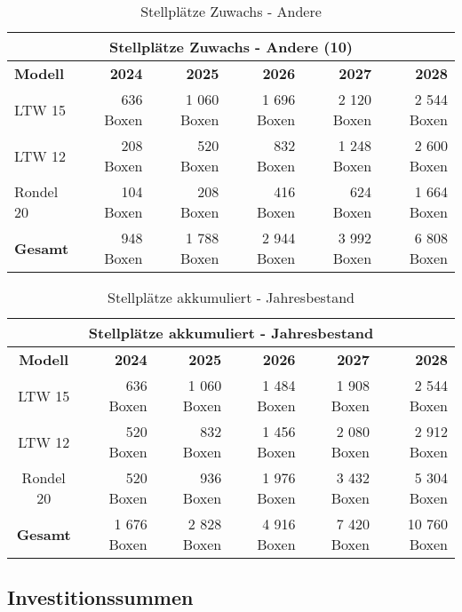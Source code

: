 \begin{table}[H]
  \centering
  \begin{tabular}{lrrrrr}
    \multicolumn{6}{c}{\textbf{Stellplätze Zuwachs - Andere (10)}}                                  \\
    \toprule
    \textbf{Modell} & \textbf{2024} & \textbf{2025} & \textbf{2026} & \textbf{2027} & \textbf{2028} \\
    \midrule
    LTW 15          & 636 Boxen     & 1 060 Boxen   & 1 696 Boxen   & 2 120 Boxen   & 2 544 Boxen   \\
    LTW 12          & 208 Boxen     & 520 Boxen     & 832 Boxen     & 1 248 Boxen   & 2 600 Boxen   \\
    Rondel 20       & 104 Boxen     & 208 Boxen     & 416 Boxen     & 624 Boxen     & 1 664 Boxen   \\
    \midrule
    \textbf{Gesamt} & 948 Boxen     & 1 788 Boxen   & 2 944 Boxen   & 3 992 Boxen   & 6 808 Boxen   \\
    \bottomrule
  \end{tabular}
  \caption{Stellplätze Zuwachs - Andere}
  \label{tab:stellplaetze_zuwachs_andere}
\end{table}

\begin{table}[H]
  \centering
  \begin{tabular}{crrrrr}
    \multicolumn{6}{c}{\textbf{Stellplätze akkumuliert - Jahresbestand}}                            \\
    \toprule
    \textbf{Modell} & \textbf{2024} & \textbf{2025} & \textbf{2026} & \textbf{2027} & \textbf{2028} \\
    \midrule
    LTW 15          & 636 Boxen     & 1 060 Boxen   & 1 484 Boxen   & 1 908 Boxen   & 2 544 Boxen   \\
    LTW 12          & 520 Boxen     & 832 Boxen     & 1 456 Boxen   & 2 080 Boxen   & 2 912 Boxen   \\
    Rondel 20       & 520 Boxen     & 936 Boxen     & 1 976 Boxen   & 3 432 Boxen   & 5 304 Boxen   \\
    \midrule
    \textbf{Gesamt} & 1 676 Boxen   & 2 828 Boxen   & 4 916 Boxen   & 7 420 Boxen   & 10 760 Boxen  \\
    \bottomrule
  \end{tabular}
  \caption{Stellplätze akkumuliert - Jahresbestand}
  \label{tab:stellplaetze_akkumuliert}
\end{table}

\subsection{Investitionssummen}

